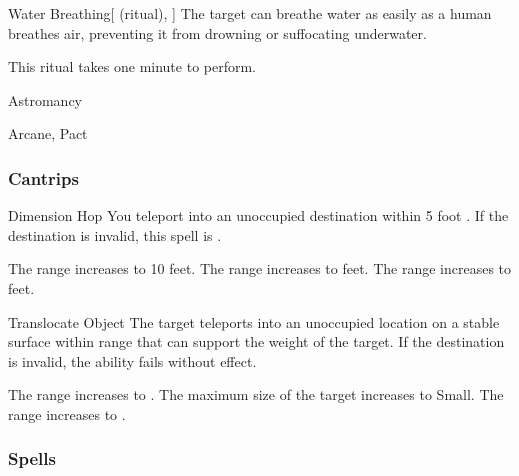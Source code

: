 \lowercase{\hypertarget{spell:Water Breathing}{}}\label{spell:Water Breathing}
\begin{attuneability}[Rank 3]{\hypertarget{spell:Water Breathing}{Water Breathing}}[ (ritual), ]
The target can breathe water as easily as a human breathes air, preventing it from drowning or suffocating underwater.

This ritual takes one minute to perform.
\end{attuneability}
\vspace{0.25em}


\newpage
\begin{spellsection}{Astromancy}

\begin{spellheader}
\end{spellheader}


 Arcane, Pact

\subsubsection{Cantrips}


\begin{freeability}{Dimension Hop}
You teleport into an unoccupied destination within 5 foot .
If the destination is invalid, this spell is .

\rankline
{} The range increases to 10 feet.
 The range increases to \rngclose feet.
 The range increases to \rngmed feet.
\end{freeability}


\begin{freeability}{Translocate Object}
The target teleports into an unoccupied location on a stable surface within range that can support the weight of the target.
If the destination is invalid, the ability fails without effect.

\rankline
{} The range increases to \rngmed.
 The maximum size of the target increases to Small.
 The range increases to \rnglong.
\end{freeability}

\end{spellsection}


\subsubsection{Spells}


